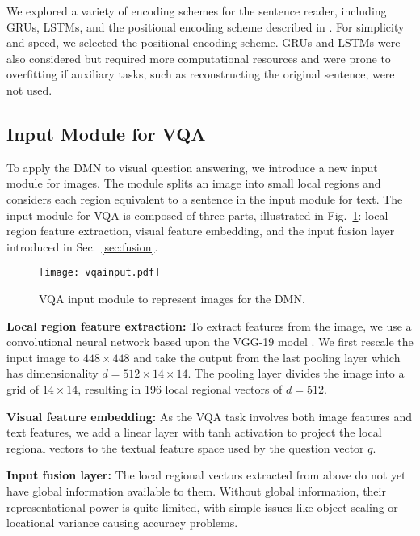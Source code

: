 \documentclass{article}
\begin{document}
We explored a variety of encoding schemes for the sentence reader, including GRUs, LSTMs, and the positional encoding scheme described in \citet{Sukhbaatar2015}.
For simplicity and speed, we selected the positional encoding scheme.
GRUs and LSTMs were also considered but required more computational resources and were prone to overfitting if auxiliary tasks, such as reconstructing the original sentence, were not used.

\subsection{Input Module for VQA} \label{inputVQA}
To apply the DMN to visual question answering, we introduce a new input module for images. The module splits an image into small local regions and considers each region equivalent to a sentence in the input module for text.
The input module for VQA is composed of three parts, illustrated in Fig.~\ref{fig:vqa}: local region feature extraction, visual feature embedding, and the input fusion layer introduced in Sec.~\ref{sec:fusion}.

\begin{figure}
   \centering
   	 	\texttt{[image: vqainput.pdf]}
   	 	\vspace{-0.4cm}
   \caption{VQA input module to represent images for the DMN.}\label{fig:result}
   \label{fig:vqa}
\end{figure}


\textbf{Local region feature extraction:} 
To extract features from the image, we use a convolutional neural network \cite{Krizhevsky2012} based upon the VGG-19 model \cite{simonyan2014very}.
We first rescale the input image to $448 \times 448$ and take the output from the last pooling layer which has dimensionality $d = 512 \times 14 \times 14$.
The pooling layer divides the image into a grid of $14 \times 14$, resulting in 196 local regional vectors of $d = 512$.

\textbf{Visual feature embedding:} 
As the VQA task involves both image features and text features, we add a linear layer with tanh activation to project the local regional vectors to the textual feature space used by the question vector $q$.

\textbf{Input fusion layer:} 
The local regional vectors extracted from above do not yet have global information available to them.
Without global information, their representational power is quite limited, with simple issues like object scaling or locational variance causing accuracy problems.
\end{document}
